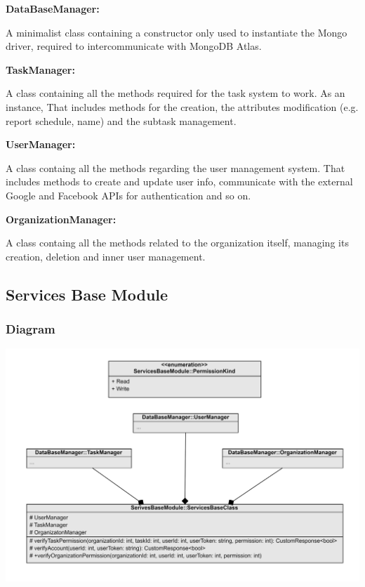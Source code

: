 \documentclass{article}
\begin{document}
\begin{itemsize}
  \item \textbf{DataBaseManager: }
  
  A minimalist class containing a constructor only used to instantiate the Mongo driver, required to intercommunicate with MongoDB Atlas.

  \item \textbf{TaskManager: }
  
  A class containing all the methods required for the task system to work. As an instance, That includes methods for the creation, the attributes modification (e.g. report schedule, name) and the subtask management.

  \item \textbf{UserManager: }
  
  A class containg all the methods regarding the user management system. That includes methods to create and update user info, communicate with the external Google and Facebook APIs for authentication and so on.

  \item \textbf{OrganizationManager: }
  
  A class containg all the methods related to the organization itself, managing its creation, deletion and inner user management.



\subsection{Services Base Module}

\subsubsection{Diagram}

\includegraphics[width=\textwidth,height=\textheight,keepaspectratio]{images/class_diagram/services_base_.jpg}


\end{itemsize}
\end{document}
